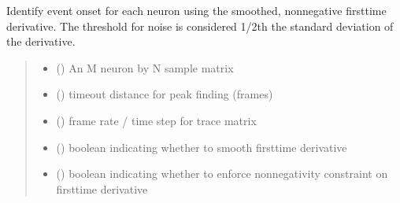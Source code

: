 \documentclass[letterpaper,10pt,english]{sphinxmanual}
\begin{document}
\begin{fulllineitems}
\label{\detokenize{CalSciPy.event_processing:CalSciPy.event_processing.identify_events}}
\pysigstartsignatures
{}
\pysigstopsignatures
\sphinxAtStartPar
Identify event onset for each neuron using the smoothed, non\sphinxhyphen{}negative first\sphinxhyphen{}time derivative. The threshold for noise
is considered 1/2th the standard deviation of the derivative.
\begin{quote}\begin{description}
\begin{itemize}
\item {} 
\sphinxAtStartPar
{} () \textendash{} An M neuron by N sample matrix

\item {} 
\sphinxAtStartPar
{} () \textendash{} timeout distance for peak finding (frames)

\item {} 
\sphinxAtStartPar
{} () \textendash{} frame rate / time step for trace matrix

\item {} 
\sphinxAtStartPar
{} () \textendash{} boolean indicating whether to smooth first\sphinxhyphen{}time derivative

\item {} 
\sphinxAtStartPar
{} () \textendash{} boolean indicating whether to enforce non\sphinxhyphen{}negativity constraint on first\sphinxhyphen{}time derivative


\end{itemize}
\end{description}
\end{quote}
\end{fulllineitems}
\end{document}
